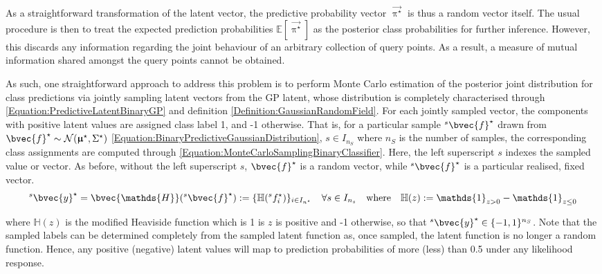 			As a straightforward transformation of the latent vector, the predictive probability vector $\vec{\uppi^{\star}}$ is thus a random vector itself. The usual procedure is then to treat the expected prediction probabilities $\mathbb{E}[\vec{\uppi^{\star}}]$ as the posterior class probabilities for further inference. However, this discards any information regarding the joint behaviour of an arbitrary collection of query points. As a result, a measure of mutual information shared amongst the query points cannot be obtained.
			
			As such, one straightforward approach to address this problem is to perform Monte Carlo estimation of the posterior joint distribution for class predictions via jointly sampling latent vectors from the GP latent, whose distribution is completely characterised through \eqref{Equation:PredictiveLatentBinaryGP} and definition \ref{Definition:GaussianRandomField}. For each jointly sampled vector, the components with positive latent values are assigned class label 1, and -1 otherwise. That is, for a particular sample ${^{s}}\bvec{f}^{\star}$ drawn from $\bvec{f}^{\star} \sim \mathcal{N}(\vec{\upmu}^{\star}, \Sigma^{\star})$ \eqref{Equation:BinaryPredictiveGaussianDistribution}, $s \in I_{n_{S}}$ where $n_{S}$ is the number of samples, the corresponding class assignments are computed through \eqref{Equation:MonteCarloSamplingBinaryClassifier}. Here, the left superscript $s$ indexes the sampled value or vector. As before, without the left superscript $s$, $\bvec{f}^{\star}$ is a random vector, while ${^{s}}\bvec{f}^{\star}$ is a particular realised, fixed vector. \begin{equation}
				{^{s}}\bvec{y}^{\star} = \bvec{\mathds{H}}({^{s}}\bvec{f}^{\star}) := \{\mathbb{H}({^{s}}f^{\star}_{i})\}_{i \in I_{n^{\star}}} \quad \forall s \in I_{n_{s}} \quad \mathrm{where} \quad \mathbb{H}(z) := \mathds{1}_{z > 0} - \mathds{1}_{z \leq 0}
			\label{Equation:MonteCarloSamplingBinaryClassifier}
			\end{equation}
			
			where $\mathbb{H}(z)$ is the modified Heaviside function which is 1 is $z$ is positive and -1 otherwise, so that ${^{s}}\bvec{y}^{\star} \in \{-1, 1\}^{n_{S}}$. Note that the sampled labels can be determined completely from the sampled latent function as, once sampled, the latent function is no longer a random function. Hence, any positive (negative) latent values will map to prediction probabilities of more (less) than 0.5 under any likelihood response.
			
